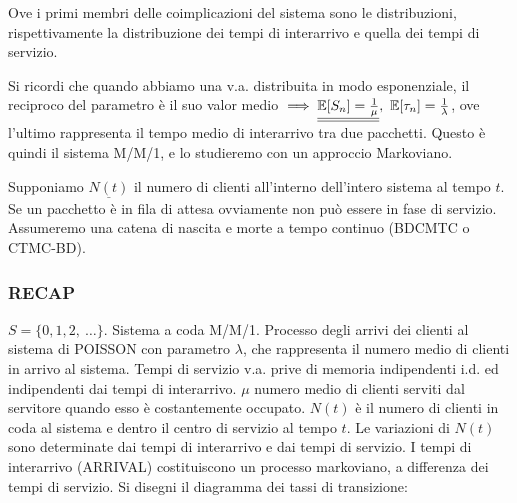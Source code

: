 Ove i primi membri delle coimplicazioni del sistema sono le distribuzioni, rispettivamente la distribuzione dei tempi di interarrivo e quella dei tempi di servizio.

Si ricordi che quando abbiamo una v.a. distribuita in modo esponenziale, il reciproco del parametro è il suo valor medio $\implies \underline{\underline{\operatorname{\mathbb{E}}[S_n] = \frac{1}{\mu}}},\ \operatorname{\mathbb{E}}[\tau_n] = \frac{1}{\lambda}$, ove l'ultimo rappresenta il tempo medio di interarrivo tra due pacchetti. Questo è quindi il sistema M/M/1, e lo studieremo con un approccio Markoviano.

Supponiamo $\underline{N(t)}$ il numero di clienti all'interno dell'intero sistema al tempo $t$. Se un pacchetto è in fila di attesa ovviamente non può essere in fase di servizio. Assumeremo una catena di nascita e morte a tempo continuo (BDCMTC o CTMC-BD).

\subsubsection{RECAP}

$S=\{0,1,2,\ \dots\}$. Sistema a coda M/M/1. Processo degli arrivi dei clienti al sistema di POISSON con parametro $\lambda$, che rappresenta il numero medio di clienti in arrivo al sistema. Tempi di servizio v.a. prive di memoria indipendenti i.d. ed indipendenti dai tempi di interarrivo. $\mu$ numero medio di clienti serviti dal servitore quando esso è costantemente occupato. $N(t)$ è il numero di clienti in coda al sistema e dentro il centro di servizio al tempo $t$. Le variazioni di $N(t)$ sono determinate dai tempi di interarrivo e dai tempi di servizio. I tempi di interarrivo (ARRIVAL) costituiscono un processo markoviano, a differenza dei tempi di servizio. Si disegni il diagramma dei tassi di transizione:

\begin{center}
\end{center}

